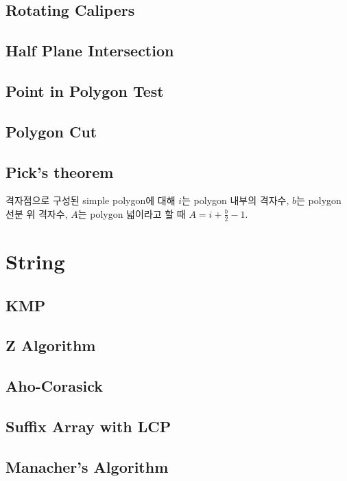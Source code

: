 \documentclass[8pt,landscape,a4paper,twocolumn]{article}
\begin{document}
\subsection{Rotating Calipers}


\subsection{Half Plane Intersection}


\subsection{Point in Polygon Test}


\subsection{Polygon Cut}


\subsection{Pick's theorem}

격자점으로 구성된 simple polygon에 대해 $i$는 polygon 내부의 격자수, $b$는 polygon 선분 위 격자수, $A$는 polygon 넓이라고 할 때 $A = i + \frac{b}{2} - 1$.

\section{String}

\subsection{KMP}


\subsection{Z Algorithm}


\subsection{Aho-Corasick}


\subsection{Suffix Array with LCP}


\subsection{Manacher's Algorithm}

\end{document}
